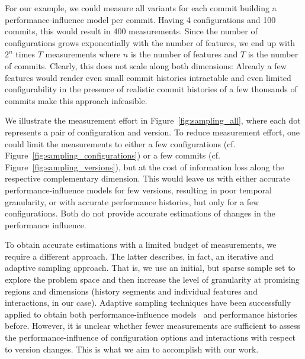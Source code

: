 \documentclass[sigconf]{acmart}
\begin{document}
	For our example, we could measure all variants for each commit building a performance-influence model per commit.
	Having 4 configurations and 100 commits, this would result in 400 measurements.
	Since the number of configurations grows exponentially with the number of features, we end up with $2^n$ times $T$ measurements where $n$ is the number of features and $T$ is the number of commits.
	Clearly, this does not scale along both dimensions: Already a few features would render even small commit histories intractable and even limited configurability in the presence of realistic commit histories of a few thousands of commits make this approach infeasible.

	{\color{magenta}We illustrate the measurement effort in Figure~\ref{fig:sampling_all}, where each dot represents a pair of configuration and version.
	To reduce measurement effort, one could limit the measurements to either a few configurations (cf. Figure~\ref{fig:sampling_configurations}) or a few commits (cf. Figure~\ref{fig:sampling_versions}), but at the cost of information loss along the respective complementary dimension.
	This would leave us with either accurate performance-influence models for few versions, resulting in poor temporal granularity, or with accurate performance histories, but only for a few configurations.
	Both do not provide accurate estimations of changes in the performance influence.}

	To obtain accurate estimations with a limited budget of measurements, we require a different approach. 
	The latter describes, in fact, an iterative and adaptive sampling approach.
	That is, we use an initial, but sparse sample set to explore the problem space and then increase the level of granularity at promising regions and dimensions (history segments and individual features and interactions, in our case).
	Adaptive sampling techniques have been successfully applied to  obtain both performance-influence models~\cite{siegmundPredictingPerformanceAutomated2012,sarkarCostEfficientSamplingPerformance} and performance histories~\cite{muhlbauer_accurate_2019} before.
	However, it is unclear whether fewer measurements are sufficient to assess the performance-influence of configuration options and interactions with respect to version changes. This is what we aim to accomplish with our work.
\end{document}
